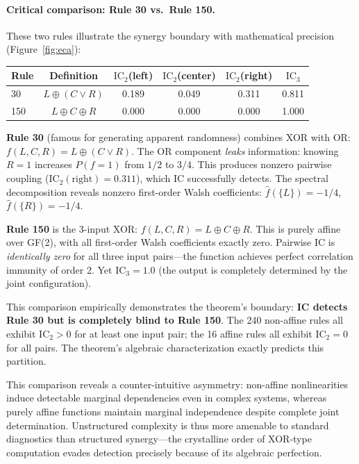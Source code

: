 \documentclass[10pt]{article} %
\theoremstyle{plain}
\theoremstyle{definition}
\newcommand{\IC}{\mathrm{IC}}  %
\begin{document}
\paragraph{Critical comparison: Rule 30 vs.\ Rule 150.} These two rules illustrate the synergy boundary with mathematical precision (Figure~\ref{fig:eca}):

\begin{center}
\begin{tabular}{lccccc}
\toprule
\textbf{Rule} & \textbf{Definition} & \textbf{$\IC_2$(left)} & \textbf{$\IC_2$(center)} & \textbf{$\IC_2$(right)} & \textbf{$\IC_3$} \\
\midrule
30 & $L \oplus (C \lor R)$ & 0.189 & 0.049 & 0.311 & 0.811 \\
150 & $L \oplus C \oplus R$ & 0.000 & 0.000 & 0.000 & 1.000 \\
\bottomrule
\end{tabular}
\end{center}

\noindent \textbf{Rule 30} (famous for generating apparent randomness) combines XOR with OR: $f(L, C, R) = L \oplus (C \lor R)$. The OR component \emph{leaks} information: knowing $R = 1$ increases $P(f = 1)$ from $1/2$ to $3/4$. This produces nonzero pairwise coupling ($\text{IC}_2(\text{right}) = 0.311$), which IC successfully detects. The spectral decomposition reveals nonzero first-order Walsh coefficients: $\hat{f}(\{L\}) = -1/4$, $\hat{f}(\{R\}) = -1/4$.

\noindent \textbf{Rule 150} is the 3-input XOR: $f(L, C, R) = L \oplus C \oplus R$. This is purely affine over GF(2), with all first-order Walsh coefficients exactly zero. Pairwise IC is \emph{identically zero} for all three input pairs---the function achieves perfect correlation immunity of order 2. Yet $\text{IC}_3 = 1.0$ (the output is completely determined by the joint configuration).

This comparison empirically demonstrates the theorem's boundary: \textbf{IC detects Rule 30 but is completely blind to Rule 150}. The 240 non-affine rules all exhibit $\IC_2 > 0$ for at least one input pair; the 16 affine rules all exhibit $\IC_2 = 0$ for all pairs. The theorem's algebraic characterization exactly predicts this partition.

This comparison reveals a counter-intuitive asymmetry: non-affine nonlinearities induce detectable marginal dependencies even in complex systems, whereas purely affine functions maintain marginal independence despite complete joint determination. Unstructured complexity is thus more amenable to standard diagnostics than structured synergy---the crystalline order of XOR-type computation evades detection precisely because of its algebraic perfection.
\end{document}
